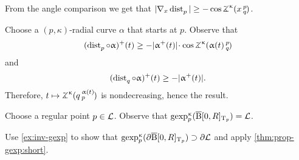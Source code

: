 From the angle comparison we get that
$|\nabla_x\distfun p|\ge-\cos \angk\kappa xpq$.

Choose a $(p,\kappa)$-radial curve $\alpha$ that starts at $p$.
Observe that 
\[(\distfun p\circ \alpha)^+(t)\ge-|\alpha^+(t)|\cdot \cos \angk\kappa {\alpha(t)}p q\]
and
\[(\distfun q\circ\alpha)^+(t)\ge -|\alpha^+(t)|.\]
Therefore, $t\mapsto\angk\kappa q{\alpha(t)}p$  is nondecreasing, hence the result.

Choose a regular point $p\in\spc{L}$.
Observe that $\gexp_p^\kappa(\cBall[\0,R]_{\T_p})\z=\spc{L}$.

Use \ref{ex:inv-gexp} to show that 
$\gexp_p^\kappa(\partial\cBall[\0,R]_{\T_p})\supset\partial\spc{L}$ and apply \ref{thm:prop-gexp:short}.

